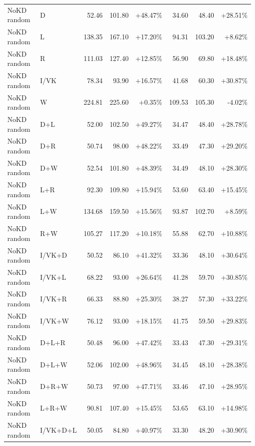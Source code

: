\documentclass[UTF8,10pt]{ctexart}
\newcommand{\better}[1]{\textcolor{goodblue}{#1}}
\newcommand{\worse}[1]{\textcolor{badred}{#1}}
\begin{document}
{\begin{longtable}{llrrrrrr}
NoKD random & D & 52.46 & 101.80 & \better{+48.47\%} & 34.60 & 48.40 & \better{+28.51\%}\\
NoKD random & L & 138.35 & 167.10 & \better{+17.20\%} & 94.31 & 103.20 & \better{+8.62\%}\\
NoKD random & R & 111.03 & 127.40 & \better{+12.85\%} & 56.90 & 69.80 & \better{+18.48\%}\\
NoKD random & I/VK & 78.34 & 93.90 & \better{+16.57\%} & 41.68 & 60.30 & \better{+30.87\%}\\
NoKD random & W & 224.81 & 225.60 & \better{+0.35\%} & 109.53 & 105.30 & \worse{-4.02\%}\\
NoKD random & D+L & 52.00 & 102.50 & \better{+49.27\%} & 34.47 & 48.40 & \better{+28.78\%}\\
NoKD random & D+R & 50.74 & 98.00 & \better{+48.22\%} & 33.49 & 47.30 & \better{+29.20\%}\\
NoKD random & D+W & 52.54 & 101.80 & \better{+48.39\%} & 34.49 & 48.10 & \better{+28.30\%}\\
NoKD random & L+R & 92.30 & 109.80 & \better{+15.94\%} & 53.60 & 63.40 & \better{+15.45\%}\\
NoKD random & L+W & 134.68 & 159.50 & \better{+15.56\%} & 93.87 & 102.70 & \better{+8.59\%}\\
NoKD random & R+W & 105.27 & 117.20 & \better{+10.18\%} & 55.88 & 62.70 & \better{+10.88\%}\\
NoKD random & I/VK+D & 50.52 & 86.10 & \better{+41.32\%} & 33.36 & 48.10 & \better{+30.64\%}\\
NoKD random & I/VK+L & 68.22 & 93.00 & \better{+26.64\%} & 41.28 & 59.70 & \better{+30.85\%}\\
NoKD random & I/VK+R & 66.33 & 88.80 & \better{+25.30\%} & 38.27 & 57.30 & \better{+33.22\%}\\
NoKD random & I/VK+W & 76.12 & 93.00 & \better{+18.15\%} & 41.75 & 59.50 & \better{+29.83\%}\\
NoKD random & D+L+R & 50.48 & 96.00 & \better{+47.42\%} & 33.43 & 47.30 & \better{+29.31\%}\\
NoKD random & D+L+W & 52.06 & 102.00 & \better{+48.96\%} & 34.45 & 48.10 & \better{+28.38\%}\\
NoKD random & D+R+W & 50.73 & 97.00 & \better{+47.71\%} & 33.46 & 47.10 & \better{+28.95\%}\\
NoKD random & L+R+W & 90.81 & 107.40 & \better{+15.45\%} & 53.65 & 63.10 & \better{+14.98\%}\\
NoKD random & I/VK+D+L & 50.05 & 84.80 & \better{+40.97\%} & 33.30 & 48.20 & \better{+30.90\%}\\

\end{longtable}}
\end{document}
